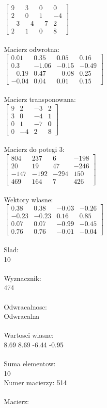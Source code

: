 \documentclass[a4paper,12pt]{article}
\begin{document}
$\begin{bmatrix} 9&3&0&0\\2&0&1&-4\\-3&-4&-7&2\\2&1&0&8 \end{bmatrix}$
\\
\\
Macierz odwrotna:\\

$\begin{bmatrix} 0.01&0.35&0.05&0.16\\0.3&-1.06&-0.15&-0.49\\-0.19&0.47&-0.08&0.25\\-0.04&0.04&0.01&0.15 \end{bmatrix}$
\\
\\
Macierz transponowana:\\

$\begin{bmatrix} 9&2&-3&2\\3&0&-4&1\\0&1&-7&0\\0&-4&2&8 \end{bmatrix}$
\\
\\
Macierz do potegi 3:\\

$\begin{bmatrix} 804&237&6&-198\\20&19&47&-246\\-147&-192&-294&150\\469&164&7&426 \end{bmatrix}$
\\
\\
Wektory wlasne:\\

$\begin{bmatrix} 0.38&0.38&-0.03&-0.26\\-0.23&-0.23&0.16&0.85\\0.07&0.07&-0.99&-0.45\\0.76&0.76&-0.01&-0.04 \end{bmatrix}$
\\
\\
Slad:\\
10
\\
\\
Wyznacznik:\\
474
\\
\\
Odwracalnosc:\\
Odwracalna
\\
\\
Wartosci wlasne:\\
8.69 8.69 -6.44 -0.95
\\
\\
Suma elementow:\\
10
\\
\newpage
Numer macierzy:
514
\\
\\
Macierz:\\
\end{document}
